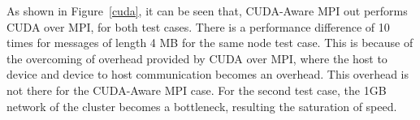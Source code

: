\documentclass[10pt]{article}
\begin{document}
As shown in Figure~\ref{cuda}, it can be seen that, CUDA-Aware MPI out performs CUDA over MPI, for both test cases. There is a performance difference of  10 times for messages of length 4 MB for the same node test case. This is because of the overcoming of overhead provided by CUDA over MPI, where the host to device and device  to host communication becomes an overhead. This overhead is not there for the CUDA-Aware MPI case.  For the second test case, the 1GB network of the cluster becomes a bottleneck, resulting the saturation of speed.


{}

\end{document}
